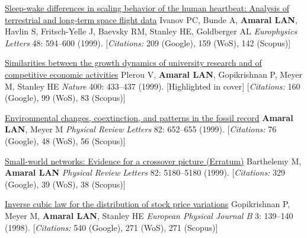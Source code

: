 \NumberedItem{\makebox[0.8cm][r]{[25]}}
\href{/people/amaral/sleep-wake-differences-in-scaling-behavior-of-the-human-heartbeat-analysis-of-terrestrial-and-long-term-space-flight-data}
{Sleep-wake differences in scaling behavior of the human heartbeat: Analysis of terrestrial and long-term space flight data}
\newline
Ivanov PC, Bunde A, {\textbf{Amaral LAN}}, Havlin S, Fritsch-Yelle J, Baevsky RM, Stanley HE, Goldberger AL
\newline
\textit{Europhysics Letters}
    48:
594--600 (1999).
    [{\em{Citations:}} 209 (Google), 159 (WoS), 142 (Scopus)]
\newline
\Gap
~
\Gap

\NumberedItem{\makebox[0.8cm][r]{[24]}}
\href{/people/amaral/similarities-between-the-growth-dynamics-of-university-research-and-of-competitive-economic-activities}
{Similarities between the growth dynamics of university research and of competitive economic activities}
\newline
Plerou V, {\textbf{Amaral LAN}}, Gopikrishnan P, Meyer M, Stanley HE
\newline
\textit{Nature}
    400:
433--437 (1999).
    [Highlighted in cover]
    [{\em{Citations:}} 160 (Google), 99 (WoS), 83 (Scopus)]
\newline
\Gap
~
\Gap

\NumberedItem{\makebox[0.8cm][r]{[23]}}
\href{/people/amaral/environmental-changes-coextinction-and-patterns-in-the-fossil-record}
{Environmental changes, coextinction, and patterns in the fossil record}
\newline
{\textbf{Amaral LAN}}, Meyer M
\newline
\textit{Physical Review Letters}
    82:
652--655 (1999).
    [{\em{Citations:}} 76 (Google), 48 (WoS), 56 (Scopus)]
\newline
\Gap
~
\Gap

\NumberedItem{\makebox[0.8cm][r]{[22]}}
\href{/people/amaral/small-world-networks-evidence-for-a-crossover-picture-vol-82-pg-3180-1999}
{Small-world networks: Evidence for a crossover picture (Erratum)}
\newline
Barthelemy M, {\textbf{Amaral LAN}}
\newline
\textit{Physical Review Letters}
    82:
5180--5180 (1999).
    [{\em{Citations:}} 329 (Google), 39 (WoS), 38 (Scopus)]
\newline
\Gap
~
\Gap

\NumberedItem{\makebox[0.8cm][r]{[21]}}
\href{/people/amaral/inverse-cubic-law-for-the-distribution-of-stock-price-variations}
{Inverse cubic law for the distribution of stock price variations}
\newline
Gopikrishnan P, Meyer M, {\textbf{Amaral LAN}}, Stanley HE
\newline
\textit{European Physical Journal B}
    3:
139--140 (1998).
    [{\em{Citations:}} 540 (Google), 271 (WoS), 271 (Scopus)]
\newline
\Gap
~
\Gap


